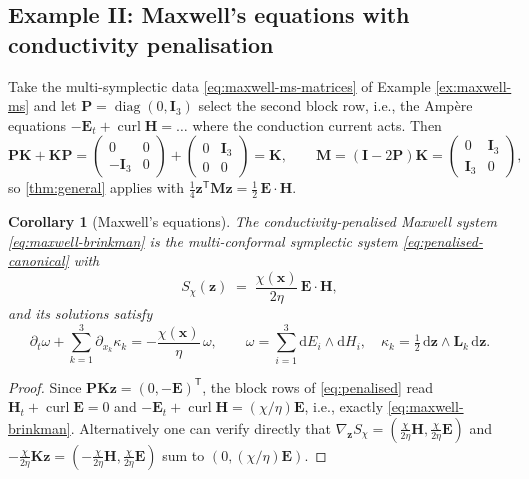 \documentclass[11pt]{article}
\newtheorem{corollary}[theorem]{Corollary}
\theoremstyle{definition}
\theoremstyle{remark}
\newcommand{\dd}{\mathrm{d}}
\newcommand{\bz}{\bm{z}}
\newcommand{\bx}{\bm{x}}
\newcommand{\bE}{\bm{E}}
\newcommand{\bH}{\bm{H}}
\newcommand{\bK}{\bm{K}}
\newcommand{\bL}{\bm{L}}
\newcommand{\bP}{\bm{P}}
\newcommand{\bM}{\bm{M}}
\newcommand{\bI}{\bm{I}}
\newcommand{\chixx}{\chi(\bx)}
\DeclareMathOperator{\diag}{diag}
\DeclareMathOperator{\curl}{curl}
\begin{document}
\subsection{Example II: Maxwell's equations with conductivity
penalisation}
\label{subsec:maxwell}

Take the multi-symplectic data \eqref{eq:maxwell-ms-matrices} of
Example \ref{ex:maxwell-ms} and let $\bP=\diag(0,\bI_3)$ select the second
block row, i.e., the Amp\`ere equations
$-\bE_t+\curl\bH=\dots$ where the conduction current acts.
Then
\[
\bP\bK+\bK\bP
= \begin{pmatrix}0&0\\-\bI_3&0\end{pmatrix}
+ \begin{pmatrix}0&\bI_3\\0&0\end{pmatrix}
= \bK ,
\qquad
\bM=(\bI-2\bP)\bK
= \begin{pmatrix}0&\bI_3\\ \bI_3&0\end{pmatrix},
\]
so \cref{thm:general} applies with
$\tfrac14\bz^{\mathsf T}\bM\bz=\tfrac12\,\bE\cdot\bH$.

\begin{corollary}[Maxwell's equations]
\label{cor:maxwell}
The conductivity-penalised Maxwell system
\eqref{eq:maxwell-brinkman} is the multi-conformal symplectic system
\eqref{eq:penalised-canonical} with
\begin{equation}
\label{eq:maxwell-Schi}
S_\chi(\bz) \;=\; \frac{\chixx}{2\eta}\,\bE\cdot\bH ,
\end{equation}
and its solutions satisfy
\begin{equation}
\label{eq:maxwell-law}
\partial_t\omega+\sum_{k=1}^{3}\partial_{x_k}\kappa_k
= -\frac{\chixx}{\eta}\,\omega,
\qquad
\omega=\sum_{i=1}^{3}\dd E_i\wedge\dd H_i,
\quad
\kappa_k=\tfrac12\,\dd\bz\wedge\bL_k\,\dd\bz .
\end{equation}
\end{corollary}

\begin{proof}
Since $\bP\bK\bz=(0,-\bE)^{\mathsf T}$, the block rows of
\eqref{eq:penalised} read $\bH_t+\curl\bE=0$ and
$-\bE_t+\curl\bH=(\chi/\eta)\bE$, i.e., exactly
\eqref{eq:maxwell-brinkman}. Alternatively one can verify directly that
$\nabla_{\bz}S_\chi=(\frac{\chi}{2\eta}\bH,\frac{\chi}{2\eta}\bE)$ and
$-\frac{\chi}{2\eta}\bK\bz=(-\frac{\chi}{2\eta}\bH,
\frac{\chi}{2\eta}\bE)$ sum to $(0,(\chi/\eta)\bE)$.
\end{proof}
\end{document}
